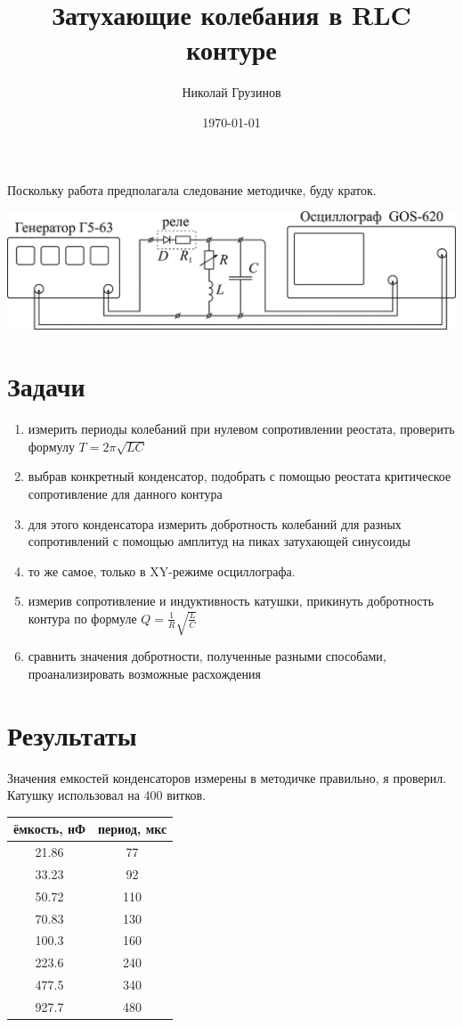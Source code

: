 \documentclass[a4paper, 12pt]{article}
\title{Затухающие колебания в RLC контуре}
\author{Николай Грузинов}
\date{\today}
\begin{document}
\maketitle

Поскольку работа предполагала следование методичке, буду краток.
\begin{center}
\includegraphics[width=0.7\linewidth]{curcuit.png}
\end{center}

\section{Задачи}
\begin{enumerate}
\item измерить периоды колебаний при нулевом сопротивлении реостата, проверить формулу $T = 2 \pi \sqrt{LC}$
\item выбрав конкретный конденсатор, подобрать с помощью реостата критическое сопротивление для данного контура
\item для этого конденсатора измерить добротность колебаний для разных сопротивлений с помощью амплитуд на пиках затухающей синусоиды
\item то же самое, только в XY-режиме осциллографа.
\item измерив сопротивление и индуктивность катушки, прикинуть добротность контура по формуле $Q = \frac{1}{R} \sqrt{\frac{L}{C}}$
\item сравнить значения добротности, полученные разными способами, проанализировать возможные расхождения
\end{enumerate}

\section{Результаты}
Значения емкостей конденсаторов измерены в методичке правильно, я проверил.
Катушку использовал на 400 витков.

\begin{tabular}{|c|c|}        \hline
ёмкость, нФ & период, мкс  \\ \hline
21.86       & 77           \\ \hline
33.23       & 92           \\ \hline
50.72       & 110          \\ \hline
70.83       & 130          \\ \hline
100.3       & 160          \\ \hline
223.6       & 240          \\ \hline
477.5       & 340          \\ \hline
927.7       & 480          \\ \hline
\end{tabular}
\end{document}
